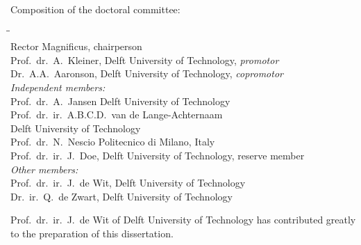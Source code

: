 \begin{titlepage}
    \bigskip
    \noindent Composition of the doctoral committee:
    \begin{tabbing}
        \hspace{\tabcolsep}\=\hspace{0.33\textwidth}\=\hspace{0.66\textwidth}                   \\[-3\medskipamount]
        \> Rector Magnificus,          \> chairperson\\
        \> Prof.\ dr.\ A.\ Kleiner,    \> Delft University of Technology, \textit{promotor}      \\
        \> Dr.\ A.A.\ Aaronson,        \> Delft University of Technology, \textit{copromotor}    \\[\medskipamount]
        \>\textit{Independent members:}                                                        \\[\smallskipamount]
        \>Prof.\ dr.\ A.\ Jansen       \> Delft University of Technology                         \\
        \>Prof.\ dr.\ ir.\ A.B.C.D.\ van de Lange-Achternaam                                    \\
        \>                             \> Delft University of Technology                         \\
        \>Prof.\ dr.\ N.\ Nescio       \> Politecnico di Milano, Italy                       \\
        \>Prof.\ dr.\ ir.\ J.\ Doe,    \> Delft University of Technology, reserve member             \\[\medskipamount]
        \>\textit{Other members:}                                                               \\[\smallskipamount]
        \>Prof.\ dr.\ ir.\ J.\ de Wit, \> Delft University of Technology                         \\
        \>Dr.\ ir.\ Q.\ de Zwart,      \> Delft University of Technology\\
    \end{tabbing}

    \medskip
    \noindent Prof.\ dr.\ ir.\ J.\ de Wit of Delft University of Technology has contributed greatly to the preparation of this dissertation.


\end{titlepage}
